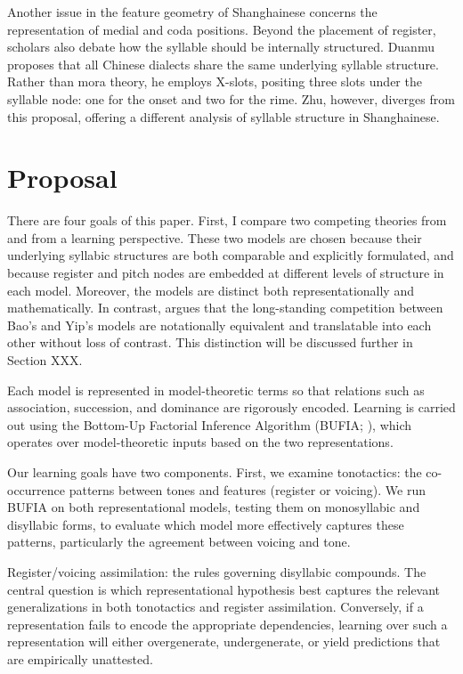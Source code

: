 \documentclass[11pt]{article}
\begin{document}
Another issue in the feature geometry of Shanghainese concerns the 
representation of medial and coda positions. Beyond the placement of register, 
scholars also debate how the syllable should be internally structured. Duanmu 
proposes that all Chinese dialects share the same underlying syllable 
structure. Rather than mora theory, he employs X-slots, positing three slots 
under the syllable node: one for the onset and two for the rime. Zhu, however, 
diverges from this proposal, offering a different analysis of syllable 
structure in Shanghainese.

\section{Proposal}
There are four goals of this paper. First, I compare two competing theories 
from \citet{duanmu1988} and \citet{zhu1999shanghai} from a learning perspective. 
These two models are chosen because their underlying syllabic structures are 
both comparable and explicitly formulated, and because register and pitch nodes 
are embedded at different levels of structure in each model. Moreover, the models 
are distinct both representationally and mathematically. In contrast, 
\citet{oakdenNotationalEquivalenceTonal2020} argues that the long-standing competition 
between Bao’s and Yip’s models are notationally equivalent and translatable into each 
other without loss of contrast. This distinction will be discussed further in Section XXX.

Each model is represented in model-theoretic terms so that relations such as association, 
succession, and dominance are rigorously encoded. Learning is carried out using the Bottom-Up 
Factorial Inference Algorithm (BUFIA; \citet{chandleeBufia2019}), which operates over model-theoretic 
inputs based on the two representations.

Our learning goals have two components. First, we examine tonotactics: the co-occurrence 
patterns between tones and features (register or voicing). We run BUFIA on both representational models, testing them on monosyllabic and disyllabic forms, to evaluate which model more effectively captures these patterns, particularly the agreement between voicing and tone.

Register/voicing assimilation: the rules governing disyllabic compounds.
The central question is which representational hypothesis best captures the relevant generalizations in both tonotactics and register assimilation. Conversely, if a representation fails to encode the appropriate dependencies, learning over such a representation will either overgenerate, undergenerate, or yield predictions that are empirically unattested.
\end{document}
